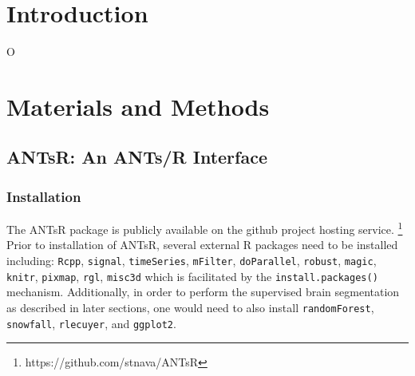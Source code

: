 \documentclass[final,5p,times,twocolumn]{elsarticle}
\begin{document}






%
%
%

\section{Introduction}

O

\section{Materials and Methods}

\subsection{ANTsR:  An ANTs/R Interface}

\subsubsection{Installation}

The ANTsR package is publicly available on the github project hosting service.%
\footnote{
https://github.com/stnava/ANTsR
}
Prior to installation of ANTsR, several external R packages
need to be installed including: \verb#Rcpp#, \verb#signal#, \verb#timeSeries#, 
\verb#mFilter#, \verb#doParallel#, \verb#robust#, \verb#magic#, \verb#knitr#, \verb#pixmap#, 
\verb#rgl#, \verb#misc3d# which is facilitated by the 
\verb#install.packages()# mechanism.  Additionally, in order
to perform the supervised brain segmentation as described 
in later sections, one would need to also install 
\verb#randomForest#, \verb#snowfall#, \verb#rlecuyer#,
and \verb#ggplot2#. 
\end{document}
